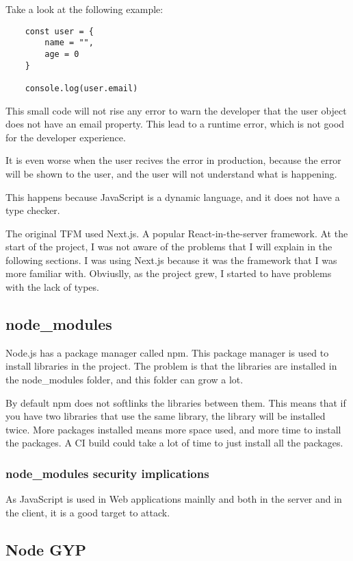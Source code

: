 \documentclass[12pt, letterpaper]{article}
\begin{document}
\begin{multicols}{2}
    Take a look at the following example:
    \begin{lstlisting}
    const user = {
        name = "",
        age = 0
    }

    console.log(user.email)
    \end{lstlisting}

    This small code will not rise any error to warn the developer that the user object does not have an email property. This lead to a runtime error, which is not good for the developer experience.

    It is even worse when the user recives the error in production, because the error will be shown to the user, and the user will not understand what is happening.

    This happens because JavaScript is a dynamic language, and it does not have a type checker.

    The original TFM used Next.js. A popular React-in-the-server framework. At the start of the project, I was not aware of the problems that I will explain in the following sections. I was using Next.js because it was the framework that I was more familiar with. Obviuslly, as the project grew, I started to have problems with the lack of types.

    \subsection{node\_modules}

    Node.js has a package manager called npm. This package manager is used to install libraries in the project. The problem is that the libraries are installed in the node\_modules folder, and this folder can grow a lot.

    By default npm does not softlinks the libraries between them. This means that if you have two libraries that use the same library, the library will be installed twice. More packages installed means more space used, and more time to install the packages. A CI build could take a lot of time to just install all the packages.

    \subsubsection{node\_modules security implications}

    As JavaScript is used in Web applications mainlly and both in the server and in the client, it is a good target to attack.


    \subsection{Node GYP}

\end{multicols}
\end{document}
